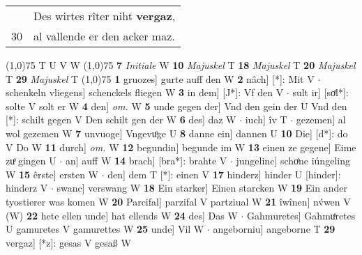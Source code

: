 \documentclass[8pt,a4paper,notitlepage]{article}
\begin{document}
\begin{table}[ht]
\begin{minipage}[t]{0.5\linewidth}
\begin{tabular}{rl}
 & Des wirtes rîter niht \textbf{vergaz},\\ 
30 & al vallende er den acker maz.\\ 
\end{tabular}
\scriptsize
\line(1,0){75} \newline
T U V W \newline
\line(1,0){75} \newline
\textbf{7} \textit{Initiale} W  \textbf{10} \textit{Majuskel} T  \textbf{18} \textit{Majuskel} T  \textbf{20} \textit{Majuskel} T  \textbf{29} \textit{Majuskel} T  \newline
\line(1,0){75} \newline
\textbf{1} gruozes] gurte auff den W \textbf{2} nâch] [*]: Mit V  $\cdot$ schenkeln vliegens] schenckels fliegen W \textbf{3} in dem] [J*]: Vf den V  $\cdot$ sult ir] [soͤl*]: solte V solt er W \textbf{4} den] \textit{om.} W \textbf{5} unde gegen der] Vnd den gein der U Vnd den [*]: schilt gegen V Den schilt gen der W \textbf{6} des] daz W  $\cdot$ iuch] îv T  $\cdot$ gezemen] al wol gezemen W \textbf{7} unvuoge] Vngevuͦge U \textbf{8} danne ein] dannen U \textbf{10} Die] [d*]: do V Do W \textbf{11} durch] \textit{om.} W \textbf{12} begundin] begunde im W \textbf{13} einen ze gegene] Eime zuͦ gingen U  $\cdot$ an] auff W \textbf{14} brach] [bra*]: brahte V  $\cdot$ jungelinc] schoͤne iúngeling W \textbf{15} êrste] ersten W  $\cdot$ den] dem T [*]: einen V \textbf{17} hinderz] hinder U [hinder]: hinderz V  $\cdot$ swanc] verswang W \textbf{18} Ein starker] Einen starcken W \textbf{19} Ein ander tyostierer was komen W \textbf{20} Parcifal] parzifal V partziual W \textbf{21} îwînen] nv́wen V (W) \textbf{22} hete ellen unde] hat ellends W \textbf{24} des] Das W  $\cdot$ Gahmuretes] Gahmuͦretes U gamuretes V gamurettes W \textbf{25} unde] Vil W  $\cdot$ angeborniu] angeborne T \textbf{29} vergaz] [*z]: gesas V gesaß W \newline
\end{minipage}
\end{table}
\end{document}
